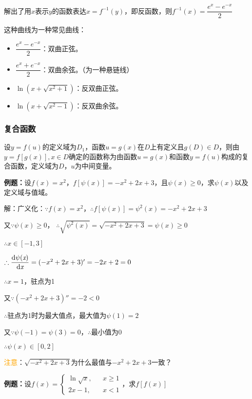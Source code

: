 \documentclass[UTF8, 12pt]{ctexart}
\begin{document}
        解出了用$x$表示$y$的函数表达$x=f^{-1}(y)$，即反函数，则$f^{-1}(x)=\dfrac{e^x-e^{-x}}{2}$

        这种曲线为一种常见曲线：

        \begin{itemize}
            \item $\dfrac{e^x-e^{-x}}{2}$：双曲正弦。
            \item $\dfrac{e^x+e^{-x}}{2}$：双曲余弦。（为一种悬链线）
            \item $\ln(x+\sqrt{x^2+1})$：反双曲正弦。
            \item $\ln(x+\sqrt{x^2-1})$：反双曲余弦。
        \end{itemize}

        \subsubsection{复合函数}
        设$y=f(u)$的定义域为$D_1$，函数$u=g(x)$在$D$上有定义且$g(D)\in D$，则由$y=f[g(x)],x\in D$确定的函数称为由函数$u=g(x)$和函数$y=f(u)$构成的复合函数，定义域为$D$，$u$为中间变量。

        \textbf{例题：}设$f(x)=x^2$，$f[\psi(x)]=-x^2+2x+3$，且$\psi(x)\geqslant 0$，求$\psi(x)$以及定义域与值域。

        解：广义化：$\because f(x)=x^2$，$\therefore f[\psi(x)]=\psi^2(x)=-x^2+2x+3$

        又$\because\psi(x)\geqslant 0$， $\therefore\sqrt{\psi^2(x)}=\sqrt{-x^2+2x+3}=\psi(x)\geqslant 0$

        $\therefore x\in[-1,3]$

        $\therefore\dfrac{\rm{d}\psi(\textit{x})}{\rm{d}\textit{x}}=(-x^2+2x+3)'=-2x+2=0$

        $\therefore x=1$，驻点为1

        又$\because(-x^2+2x+3)''=-2<0$

        $\therefore$驻点为1时为最大值点，最大值为$\psi(1)=2$

        又$\because\psi(-1)=\psi(3)=0$，$\therefore$最小值为0

        $\therefore\psi(x)\in[0,2]$

        \textcolor{orange}{注意}：$\sqrt{-x^2+2x+3}$为什么最值与$-x^2+2x+3$一致？

        \textbf{例题：}设$
        f(x)=\left\{
        \begin{array}{lcl}
            \ln\sqrt{x}, &  & x\geqslant 1 \\
            2x-1,        &  & x< 1
        \end{array}
        \right.
        $，求$f[f(x)]$
\end{document}
